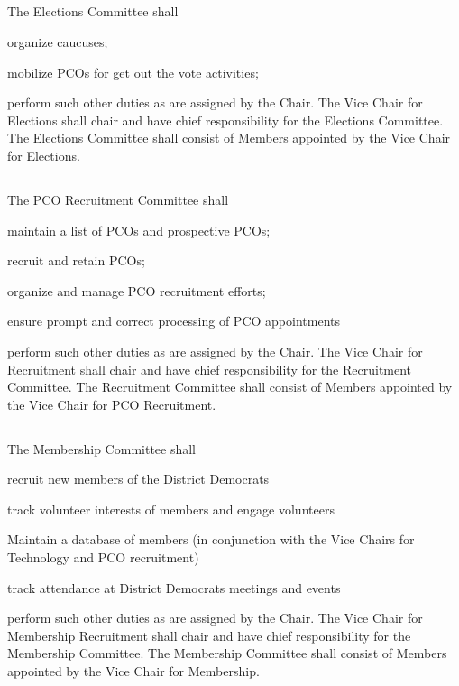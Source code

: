 \subsection{} \label{elections-committee}
The Elections Committee shall
\begin{inlinealphalist}
    \item organize caucuses;
    \item mobilize PCOs for get out the vote activities;
    \item perform such other duties as are assigned by the Chair. The Vice Chair for Elections shall chair and have chief responsibility for the Elections Committee. The Elections Committee shall consist of Members appointed by the Vice Chair for Elections.
\end{inlinealphalist}

\subsection{} \label{pco-recruitment-committee}
The PCO Recruitment Committee shall
\begin{inlinealphalist}
    \item maintain a list of PCOs and prospective PCOs;
    \item recruit and retain PCOs;
    \item organize and manage PCO recruitment efforts;
    \item ensure prompt and correct processing of PCO appointments
    \item perform such other duties as are assigned by the Chair. The Vice Chair for Recruitment shall chair and have chief responsibility for the Recruitment Committee.  The Recruitment Committee shall consist of Members appointed by the Vice Chair for PCO Recruitment.
\end{inlinealphalist}

\subsection{} \label{membership-committee}
The Membership Committee shall
\begin{inlinealphalist}
    \item recruit new members of the \fortythird{} District Democrats
    \item track volunteer interests of members and engage volunteers
    \item Maintain a database of members (in conjunction with the Vice Chairs for Technology and PCO recruitment)
    \item track attendance at \fortythird{} District Democrats meetings and events
    \item perform such other duties as are assigned by the Chair. The Vice Chair for Membership Recruitment shall chair and have chief responsibility for the Membership Committee. The Membership Committee shall consist of Members appointed by the Vice Chair for Membership.
\end{inlinealphalist}

